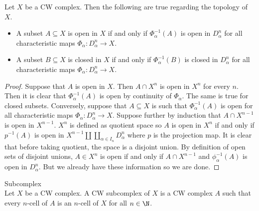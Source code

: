 \documentclass[a4paper]{article}
\begin{document}
\begin{prp}{}{} Let $X$ be a CW complex. Then the following are true regarding the topology of $X$. 
\begin{itemize}
\item A subset $A\subseteq X$ is open in $X$ if and only if $\Phi_\alpha^{-1}(A)$ is open in $D_\alpha^n$ for all characteristic maps $\Phi_\alpha:D_\alpha^n\to X$. 
\item A subset $B\subseteq X$ is closed in $X$ if and only if $\Phi_\alpha^{-1}(B)$ is closed in $D_\alpha^n$ for all characteristic maps $\Phi_\alpha:D_\alpha^n\to X$. 
\end{itemize} 
\begin{proof}
Suppose that $A$ is open in $X$. Then $A\cap X^n$ is open in $X^n$ for every $n$. Then it is clear that $\Phi_\alpha^{-1}(A)$ is open by continuity of $\Phi_\alpha$. The same is true for closed subsets. Conversely, suppose that $A\subseteq X$ is such that $\Phi_\alpha^{-1}(A)$ is open for all characteristic maps $\Phi_\alpha:D_\alpha^n\to X$. Suppose further by induction that $A\cap X^{n-1}$ is open in $X^{n-1}$. $X^n$ is defined as quotient space so $A$ is open in $X^n$ if and only if $p^{-1}(A)$ is open in $X^{n-1}\amalg\coprod_{\alpha\in I_n}D_\alpha^n$ where $p$ is the projection map. It is clear that before taking quotient, the space is a disjoint union. By definition of open sets of disjoint unions, $A\in X^n$ is open if and only if $A\cap X^{n-1}$ and $\phi_\alpha^{-1}(A)$ is open in $D_\alpha^n$. But we already have these information so we are done. 
\end{proof}
\end{prp}

\begin{defn}{Subcomplex}{}\\
Let $X$ be a CW complex. A CW subcomplex of $X$ is a CW complex $A$ such that every $n$-cell of $A$ is an $n$-cell of $X$ for all $n\in\N$. 
\end{defn}
\end{document}
